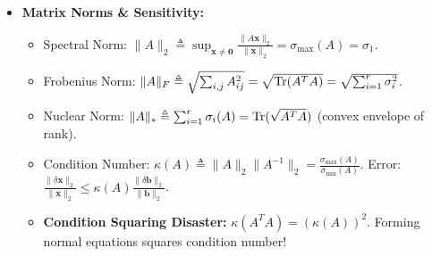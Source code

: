 \begin{tcolorbox}[breakable, colback=primarylight!30, colframe=primarydark, title={\large \textbf{1. Linear Algebra, Subspaces \& Regularized Regression (Weeks 1, 3--4)}}]
\begin{itemize}[leftmargin=*, noitemsep, topsep=2pt]
\begin{itemize}[leftmargin=*, noitemsep]
    \end{itemize}
    \item \textbf{Matrix Norms \& Sensitivity:}
    \begin{itemize}[leftmargin=*, noitemsep]
        \item Spectral Norm: $\|A\|_2 \triangleq \sup_{\mathbf{x} \ne \mathbf{0}} \frac{\|A\mathbf{x}\|_2}{\|\mathbf{x}\|_2} = \sigma_{\max}(A) = \sigma_1$.
        \item Frobenius Norm: $\|A\|_F \triangleq \sqrt{\sum_{i,j} A_{ij}^2} = \sqrt{\operatorname{Tr}(A^T A)} = \sqrt{\sum_{i=1}^r \sigma_i^2}$.
        \item Nuclear Norm: $\|A\|_* \triangleq \sum_{i=1}^r \sigma_i(A) = \operatorname{Tr}(\sqrt{A^T A})$ (convex envelope of rank).
        \item Condition Number: $\kappa(A) \triangleq \|A\|_2 \|A^{-1}\|_2 = \frac{\sigma_{\max}(A)}{\sigma_{\min}(A)}$. Error: $\frac{\|\delta \mathbf{x}\|_2}{\|\mathbf{x}\|_2} \le \kappa(A) \frac{\|\delta \mathbf{b}\|_2}{\|\mathbf{b}\|_2}$.
        \item \textbf{Condition Squaring Disaster:} $\kappa(A^T A) = (\kappa(A))^2$. Forming normal equations squares condition number!
    \end{itemize}
\end{itemize}
\end{tcolorbox}

